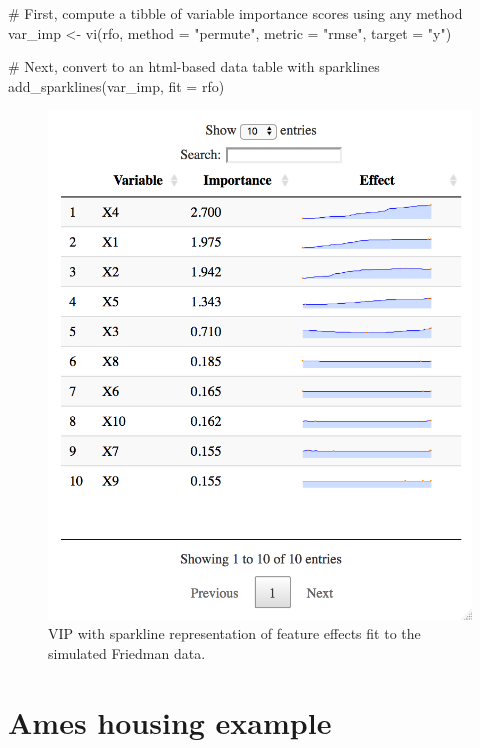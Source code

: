 \begin{example}
# First, compute a tibble of variable importance scores using any method
var_imp <- vi(rfo, method = "permute", metric = "rmse", target = "y")

# Next, convert to an html-based data table with sparklines
add_sparklines(var_imp, fit = rfo)
\end{example}

\begin{figure}[!htb]
  \centering 
  \includegraphics[width=1\linewidth]{figures/sparklines} 
  \caption{VIP with sparkline representation of feature effects fit to the simulated Friedman data.}
  \label{fig:sparklines}
\end{figure}


\section{Ames housing example}

